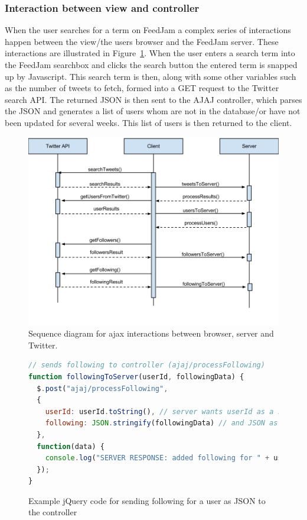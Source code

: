 \subsubsection{Interaction between view and controller} %
\label{viewControllerInteraction}
When the user searches for a term on FeedJam a complex series of interactions happen between the view/the users browser and the FeedJam server. These interactions are illustrated in Figure~\ref{fig:AjaxInteractions}. When the user enters a search term into the FeedJam searchbox and clicks the search button the entered term is snapped up by Javascript. This search term is then, along with some other variables such as the number of tweets to fetch, formed into a GET request to the Twitter search API. The returned JSON is then sent to the AJAJ controller, which parses the JSON and generates a list of users whom are not in the database/or have not been updated for several weeks. This list of users is then returned to the client.

\begin{figure}[ht]
    \begin{minipage}[b]{1\linewidth}
        \centering
        \includegraphics[width=1\textwidth]{figures/sequencediagram}
        \caption{Sequence diagram for ajax interactions between browser, server and Twitter.}
        \label{fig:AjaxInteractions}
    \end{minipage}
\end{figure}

\begin{figure}[h!]
\begin{lstlisting}[language=javascript]
// sends following to controller (ajaj/processFollowing)
function followingToServer(userId, followingData) {
  $.post("ajaj/processFollowing", 
  { 
    userId: userId.toString(), // server wants userId as a string
    following: JSON.stringify(followingData) // and JSON as a string
  },
  function(data) {
    console.log("SERVER RESPONSE: added following for " + userId);
  });
}
\end{lstlisting}
\caption{Example jQuery code for sending following for a user as JSON to the controller}
\label{ajaxRequest}
\end{figure}

